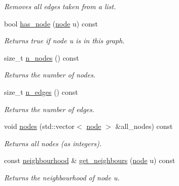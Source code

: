 \begin{DoxyCompactItemize}
\begin{DoxyCompactList}\small\item\em Removes all edges taken from a list. \end{DoxyCompactList}\item 
\mbox{\label{classlgraph_1_1xxgraph_a24645831355480e05f8e7ba75a5348c8}} 
bool \hyperlink{classlgraph_1_1xxgraph_a24645831355480e05f8e7ba75a5348c8}{has\+\_\+node} (\hyperlink{namespacelgraph_a397169dd66adf725210a30fb7251773e}{node} u) const
\begin{DoxyCompactList}\small\item\em Returns true if node {\itshape u} is in this graph. \end{DoxyCompactList}\item 
size\+\_\+t \hyperlink{classlgraph_1_1xxgraph_a67f651617ada4053b569102b9a54cab0}{n\+\_\+nodes} () const
\begin{DoxyCompactList}\small\item\em Returns the number of nodes. \end{DoxyCompactList}\item 
size\+\_\+t \hyperlink{classlgraph_1_1xxgraph_af00bce8b07a42754601d1e3bebe2c1fa}{n\+\_\+edges} () const
\begin{DoxyCompactList}\small\item\em Returns the number of edges. \end{DoxyCompactList}\item 
\mbox{\label{classlgraph_1_1xxgraph_a9a24f0e1c0c40abc505e35d0dd9bf10a}} 
void \hyperlink{classlgraph_1_1xxgraph_a9a24f0e1c0c40abc505e35d0dd9bf10a}{nodes} (std\+::vector$<$ \hyperlink{namespacelgraph_a397169dd66adf725210a30fb7251773e}{node} $>$ \&all\+\_\+nodes) const
\begin{DoxyCompactList}\small\item\em Returns all nodes (as integers). \end{DoxyCompactList}\item 
const \hyperlink{namespacelgraph_a052e7766c13f3a43cec0aec8173fdede}{neighbourhood} \& \hyperlink{classlgraph_1_1xxgraph_a745a535506115c66ce0993ef7e7759ba}{get\+\_\+neighbours} (\hyperlink{namespacelgraph_a397169dd66adf725210a30fb7251773e}{node} u) const
\begin{DoxyCompactList}\small\item\em Returns the neighbourhood of node u. \end{DoxyCompactList}\item 

\end{DoxyCompactItemize}
